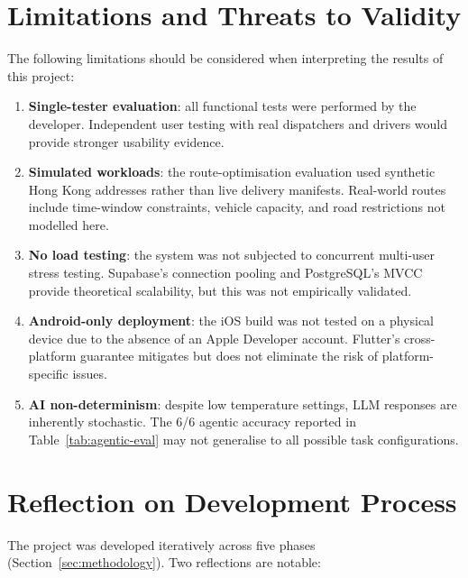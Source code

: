 \section{Limitations and Threats to Validity}
\label{sec:disc-limitations}

The following limitations should be considered when interpreting the
results of this project:

\begin{enumerate}
  \item \textbf{Single-tester evaluation}: all functional tests were
        performed by the developer.  Independent user testing with real
        dispatchers and drivers would provide stronger usability evidence.
  \item \textbf{Simulated workloads}: the route-optimisation evaluation
        used synthetic Hong Kong addresses rather than live delivery
        manifests.  Real-world routes include time-window constraints,
        vehicle capacity, and road restrictions not modelled here.
  \item \textbf{No load testing}: the system was not subjected to
        concurrent multi-user stress testing.  Supabase's connection
        pooling and PostgreSQL's MVCC provide theoretical scalability, but
        this was not empirically validated.
  \item \textbf{Android-only deployment}: the iOS build was not
        tested on a physical device due to the absence of an Apple
        Developer account.  Flutter's cross-platform guarantee mitigates
        but does not eliminate the risk of platform-specific issues.
  \item \textbf{AI non-determinism}: despite low temperature settings,
        LLM responses are inherently stochastic.  The 6/6 agentic accuracy
        reported in Table~\ref{tab:agentic-eval} may not generalise to
        all possible task configurations.
\end{enumerate}

\section{Reflection on Development Process}
\label{sec:disc-process}

The project was developed iteratively across five phases
(Section~\ref{sec:methodology}).  Two reflections are notable:

